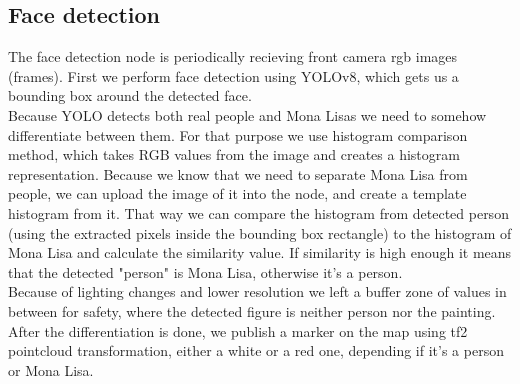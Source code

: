\documentclass[a4paper,
  twoside, %
  headlines=2.1 %
  ]{scrartcl}
\begin{document}
\subsection{Face detection}
The face detection node is periodically recieving front camera rgb images (frames). First we perform face detection using YOLOv8, which gets us a bounding box around the detected face. \\
Because YOLO detects both real people and Mona Lisas we need to somehow differentiate between them. For that purpose we use histogram comparison method, which takes RGB values from the image and creates a histogram representation. Because we know that we need to separate Mona Lisa from people, we can upload the image of it into the node, and create a template histogram from it. That way we can compare the histogram from detected person (using the extracted pixels inside the bounding box rectangle) to the histogram of Mona Lisa and calculate the similarity value. If similarity is high enough it means that the detected "person" is Mona Lisa, otherwise it's a person. \\
Because of lighting changes and lower resolution we left a buffer zone of values in between for safety, where the detected figure is neither person nor the painting. \\
After the differentiation is done, we publish a marker on the map using tf2 pointcloud transformation, either a white or a red one, depending if it's a person or Mona Lisa.
\end{document}
